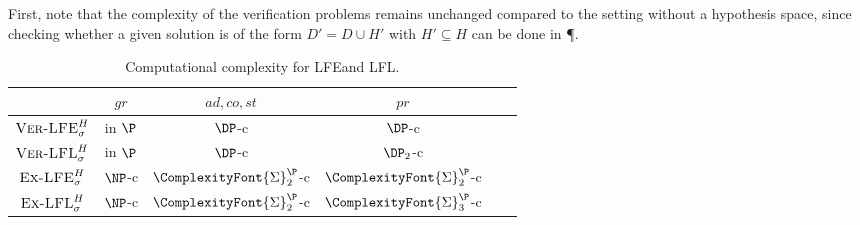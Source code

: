 \documentclass[letterpaper]{article} %
\newcommand{\SigmaP}[1]{\ComplexityFont{\Sigma}_{#1}^{\P}}
\newcommand{\adm}{\textit{ad}}
\newcommand{\com}{\textit{co}}
\newcommand{\stb}{\textit{st}}
\newcommand{\prf}{\textit{pr}}
\newcommand{\grd}{\textit{gr}}
\newcommand{\asm}{\ensuremath{\mathcal{A}}}
\newcommand{\atoms}{\mathcal{L}}
\newcommand{\ruleset}{\mathcal{R}}
\newcommand{\assumptions}{\mathcal{A}}
\newcommand{\contra}{c}
\newcommand{\ABAdef}{D=(\atoms,\ruleset,\assumptions,\contra)}
\newcommand{\VerLFE}[2]{\textsc{Ver-LFE}_{#1}^{#2}}
\newcommand{\VerLFL}[2]{\textsc{Ver-LFL}_{#1}^{#2}}
\newcommand{\ExLFE}[2]{\textsc{Ex-LFE}_{#1}^{#2}}
\newcommand{\ExLFL}[2]{\textsc{Ex-LFL}_{#1}^{#2}}
\newcommand{\hypo}{H}
\newcommand{\Xpos}{\mathcal{X}^{pos}}
\newcommand{\Xneg}{\mathcal{X}^{neg}}
\begin{document}
First, note that the complexity of the verification problems remains unchanged compared to the setting without a hypothesis space, since checking whether a given solution is of the form $D'=D\cup H'$ with $H'\subseteq H$ can be done in \P.

\begin{table}[t]
    \centering
        \caption{Computational complexity for LFE\Hy and LFL\!\Hy.}%
    \begin{tabular}{c c c c c c}
      \toprule
      &  $\grd$ & $\adm,\com,\stb$ & $\prf$   \\ \midrule
    $\VerLFE{\sigma}{H}$ & in $\P$ & $\DP$-c & $\DP$-c  \\
    $\VerLFL{\sigma}{H}$ & in $\P$ & $\DP$-c & $\DP_2$-c  \\
    $\ExLFE{\sigma}{H}$  & $\NP$-c & $\SigmaP{2}$-c & $\SigmaP{2}$-c  \\
    $\ExLFL{\sigma}{H}$ & $\NP$-c & $\SigmaP{2}$-c & $\SigmaP{3}$-c \\ \bottomrule
    \end{tabular}
    \label{tab:complexity hypo}
\end{table}




\end{document}
